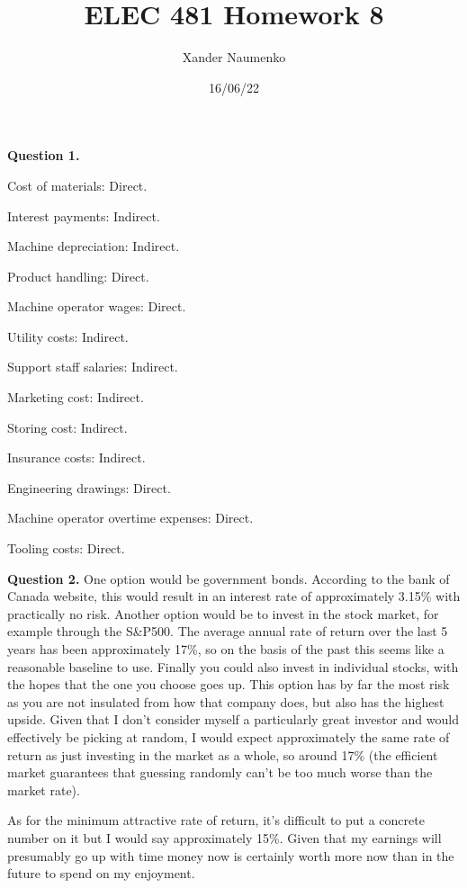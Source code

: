 \documentclass[letterpaper, reqno,11pt]{article}
\begin{document}
\title{ELEC 481 Homework 8}
\date{16/06/22}
\author{Xander Naumenko}
\maketitle

{\noindent\bf Question 1.} 

Cost of materials: Direct. 

Interest payments: Indirect. 

Machine depreciation: Indirect. 

Product handling: Direct. 

Machine operator wages: Direct. 

Utility costs: Indirect. 

Support staff salaries: Indirect. 

Marketing cost: Indirect. 

Storing cost: Indirect. 

Insurance costs: Indirect. 

Engineering drawings: Direct. 

Machine operator overtime expenses: Direct. 

Tooling costs: Direct. 

{\noindent\bf Question 2.} One option would be government bonds. According to the bank of Canada website, this would result in an interest rate of approximately 3.15\% with practically no risk. Another option would be to invest in the stock market, for example through the S&P500. The average annual rate of return over the last 5 years has been approximately 17\%, so on the basis of the past this seems like a reasonable baseline to use. Finally you could also invest in individual stocks, with the hopes that the one you choose goes up. This option has by far the most risk as you are not insulated from how that company does, but also has the highest upside. Given that I don't consider myself a particularly great investor and would effectively be picking at random, I would expect approximately the same rate of return as just investing in the market as a whole, so around 17\% (the efficient market guarantees that guessing randomly can't be too much worse than the market rate). 

As for the minimum attractive rate of return, it's difficult to put a concrete number on it but I would say approximately 15\%. Given that my earnings will presumably go up with time money now is certainly worth more now than in the future to spend on my enjoyment. 
\end{document}
